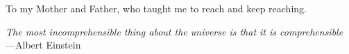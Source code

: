 %
\begin{frontmatter}

%
%
\makefrontmatter

%
%
%
%
%
%
\begin{dedication}
  To my Mother and Father, who taught me to reach and keep reaching.
\end{dedication}


%
%



%
%
\begin{epigraph} %
  \emph{The most incomprehensible thing about the universe is that it is comprehensible}\\
  ---Albert Einstein
\end{epigraph}

%



\end{frontmatter}
